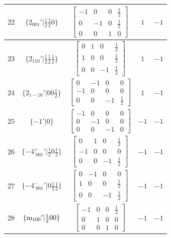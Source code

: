 \documentclass[fleqn,8pt]{jsarticle}
\begin{document}
\begin{longtable}{ccccc}
$ 22 $ & $ \{2{}_{001}{}'|\frac{1}{2} \frac{1}{2} 0\} $ & $ \begin{bmatrix} -1 & 0 & 0 & \frac{1}{2} \\ 0 & -1 & 0 & \frac{1}{2} \\ 0 & 0 & 1 & 0 \end{bmatrix} $ & $ 1 $ & $ -1 $ \\ \hline
$ 23 $ & $ \{2{}_{110}{}'|\frac{1}{2} \frac{1}{2} \frac{1}{2}\} $ & $ \begin{bmatrix} 0 & 1 & 0 & \frac{1}{2} \\ 1 & 0 & 0 & \frac{1}{2} \\ 0 & 0 & -1 & \frac{1}{2} \end{bmatrix} $ & $ 1 $ & $ -1 $ \\ \hline
$ 24 $ & $ \{2{}_{1-10}{}'|0 0 \frac{1}{2}\} $ & $ \begin{bmatrix} 0 & -1 & 0 & 0 \\ -1 & 0 & 0 & 0 \\ 0 & 0 & -1 & \frac{1}{2} \end{bmatrix} $ & $ 1 $ & $ -1 $ \\ \hline
$ 25 $ & $ \{-1{}'|0\} $ & $ \begin{bmatrix} -1 & 0 & 0 & 0 \\ 0 & -1 & 0 & 0 \\ 0 & 0 & -1 & 0 \end{bmatrix} $ & $ -1 $ & $ -1 $ \\ \hline
$ 26 $ & $ \{-4^{+}_{\,\,001}{}'|\frac{1}{2} 0 \frac{1}{2}\} $ & $ \begin{bmatrix} 0 & 1 & 0 & \frac{1}{2} \\ -1 & 0 & 0 & 0 \\ 0 & 0 & -1 & \frac{1}{2} \end{bmatrix} $ & $ -1 $ & $ -1 $ \\ \hline
$ 27 $ & $ \{-4^{-}_{\,\,001}{}'|0 \frac{1}{2} \frac{1}{2}\} $ & $ \begin{bmatrix} 0 & -1 & 0 & 0 \\ 1 & 0 & 0 & \frac{1}{2} \\ 0 & 0 & -1 & \frac{1}{2} \end{bmatrix} $ & $ -1 $ & $ -1 $ \\ \hline
$ 28 $ & $ \{{\rm m}_{100}{}'|\frac{1}{2} 0 0\} $ & $ \begin{bmatrix} -1 & 0 & 0 & \frac{1}{2} \\ 0 & 1 & 0 & 0 \\ 0 & 0 & 1 & 0 \end{bmatrix} $ & $ -1 $ & $ -1 $ \\ \hline

\end{longtable}
\end{document}
